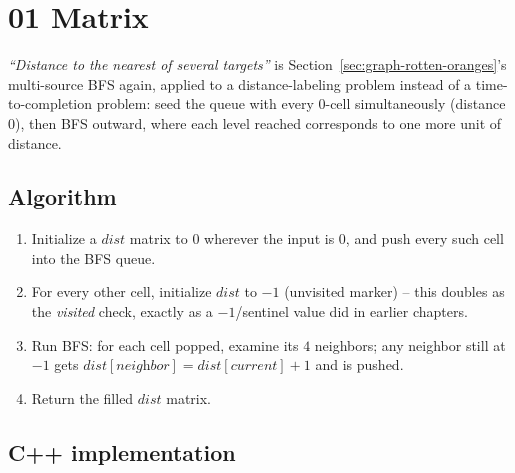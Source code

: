 \section{01 Matrix}
\label{sec:graph-01-matrix}


\begin{patternbox}
\emph{``Distance to the nearest of several targets''} is
Section~\ref{sec:graph-rotten-oranges}'s multi-source BFS again, applied
to a distance-labeling problem instead of a time-to-completion problem:
seed the queue with every $0$-cell simultaneously (distance $0$), then
BFS outward, where each level reached corresponds to one more unit of
distance.
\end{patternbox}

\subsection*{Algorithm}

\begin{enumerate}
  \item Initialize a $\textit{dist}$ matrix to $0$ wherever the input
        is $0$, and push every such cell into the BFS queue.
  \item For every other cell, initialize $\textit{dist}$ to $-1$
        (unvisited marker) -- this doubles as the \textit{visited}
        check, exactly as a $-1$/sentinel value did in earlier
        chapters.
  \item Run BFS: for each cell popped, examine its $4$ neighbors; any
        neighbor still at $-1$ gets $\textit{dist}[\textit{neighbor}] =
        \textit{dist}[\textit{current}] + 1$ and is pushed.
  \item Return the filled $\textit{dist}$ matrix.
\end{enumerate}

\subsection*{C++ implementation}

